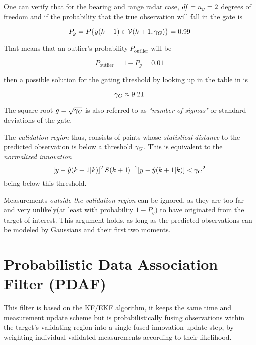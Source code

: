 One can verify that for the bearing and range radar case, $df = n_{y} =2 $ degrees of freedom and if the probability that the true observation will fall in the gate is

$$P_{g} = P\{ {y}(k+1)\in\mathcal{V}(k+1,{\gamma_G})\}=0.99$$


That means that an outlier's probability $P_{\text{outlier}}$ will be

$$P_{\text{outlier}} = 1 - P_g = 0.01$$

then a possible solution for the gating threshold by looking up in the table in  is

$${\gamma_G} \approx 9.21$$


The square root $g = \sqrt{{\gamma_G}}$ is also referred to as \emph{
"number of sigmas"} or standard deviations of the gate.

The \emph{validation region} thus, consists of points whose  \emph{statistical distance} to the predicted observation is below a threshold ${\gamma_G}$.  This is equivalent to the \emph{normalized innovation} $$[{y}-{\hat{{y}}}(k+1|k)]^T S(k+1)^{-1} [{y}-{\hat{{y}}}(k+1|k)] < {\gamma_G}^2 $$ being below this threshold.

Measurements \emph{outside the validation region} can be ignored, as they are too far and very unlikely(at least with probability $1-P_g$) to have originated from the target of interest. This argument holds, as long as the predicted observations can be modeled by Gaussians and their first two moments.
\section{Probabilistic Data Association Filter (PDAF)}

This filter is based on the KF/EKF algorithm, it keeps the same time and measurement update scheme but is probabilistically fusing
observations within the target's validating region into a single fused innovation update step, by weighting individual validated measurements according to their likelihood.

